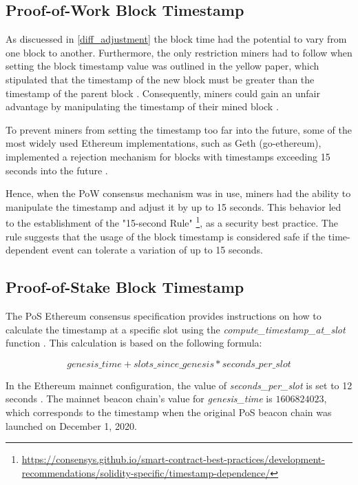 \subsection{Proof-of-Work Block Timestamp}
As discuessed in \ref{diff_adjustment} the block time had the
potential to vary from one block to another. Furthermore, the only restriction
miners had to follow when setting the block timestamp value was outlined in the
yellow paper, which stipulated that the timestamp of the new block must be
greater than the timestamp of the parent block \cite{ethyellowpaper2023}.
Consequently, miners could gain an unfair advantage by manipulating the
timestamp of their mined block \cite{swc116}.


To prevent miners from setting the timestamp too far into the future, some of the most widely used Ethereum implementations, such as Geth (go-ethereum), implemented a rejection mechanism for blocks with timestamps exceeding 15 seconds into the future \cite{go-ethereum-15-sek-limit}.

Hence, when the PoW consensus mechanism was in use, miners had the ability to
manipulate the timestamp and adjust it by up to 15 seconds. This behavior led
to the establishment of the "15-second Rule"
\footnote{\url{https://consensys.github.io/smart-contract-best-practices/development-recommendations/solidity-specific/timestamp-dependence/}},
as a security best practice. The
rule suggests that the usage of the block timestamp is considered
safe if the time-dependent event can tolerate a variation of up to 15 seconds.

\subsection{Proof-of-Stake Block Timestamp}

The PoS Ethereum consensus specification provides instructions on how to
calculate the timestamp at a specific slot using the
\textit{compute\_timestamp\_at\_slot} function \cite{compute-timestamp-at-slot}.
This calculation is based on the following formula:

\begin{equation}
genesis\_time + slots\_since\_genesis *
seconds\_per\_slot
\end{equation}


In the Ethereum mainnet configuration, the value of \textit{seconds\_per\_slot} is set to
12 seconds \cite{seconds-per-slot-mainnet} \cite{seconds-per-slot-mainnet-doc}.
The mainnet beacon chain's value for \textit{genesis\_time} is $1606824023$, which
corresponds to the timestamp when the original PoS beacon chain was launched on
December 1, 2020.

